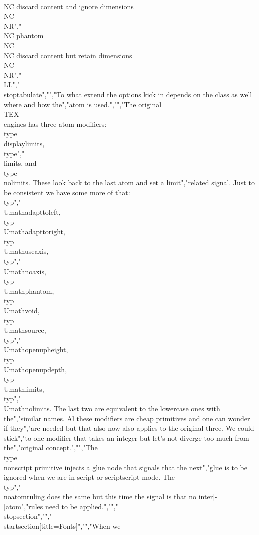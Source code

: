       \\NC discard content and ignore dimensions \\NC \\NR","\\NC phantom    \\NC         \\NC discard content but retain dimensions \\NC \\NR","\\LL","\\stoptabulate","","To what extend the options kick in depends on the class as well where and how the","atom is used.","","The original \\TEX\\ engines has three atom modifiers: \\type {\\displaylimits}, \\type","{\\limits}, and \\type {\\nolimits}. These look back to the last atom and set a limit","related signal. Just to be consistent we have some more of that: \\typ","{\\Umathadapttoleft}, \\typ {\\Umathadapttoright}, \\typ {\\Umathuseaxis}, \\typ","{\\Umathnoaxis}, \\typ {\\Umathphantom}, \\typ {\\Umathvoid}, \\typ {\\Umathsource}, \\typ","{\\Umathopenupheight}, \\typ {\\Umathopenupdepth}, \\typ {\\Umathlimits}, \\typ","{\\Umathnolimits}. The last two are equivalent to the lowercase ones with the","similar names. Al these modifiers are cheap primitives and one can wonder if they","are needed but that also now also applies to the original three. We could stick","to one modifier that takes an integer but let's not diverge too much from the","original concept.","","The \\type {\\nonscript} primitive injects a glue node that signals that the next","glue is to be ignored when we are in script or scriptscript mode. The \\typ","{\\noatomruling} does the same but this time the signal is that no inter|-|atom","rules need to be applied.","","\\stopsection","","\\startsection[title={Fonts}]","","When we 